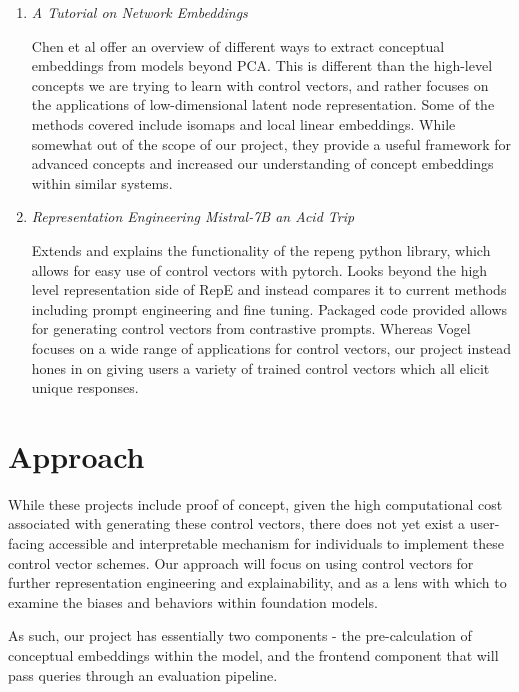 \documentclass[11pt,a4paper]{article}
\begin{document}
\begin{enumerate}
\item \emph{A Tutorial on Network Embeddings}~\cite{chen2018network}

Chen et al offer an overview of different ways to extract conceptual embeddings from models beyond PCA. This is different than the high-level concepts we are trying to learn with control vectors, and rather focuses on the applications of low-dimensional latent node representation. Some of the methods covered include isomaps and local linear embeddings. While somewhat out of the scope of our project, they provide a useful framework for advanced concepts and increased our understanding of concept embeddings within similar systems.

\item \emph{Representation Engineering Mistral-7B an Acid Trip}~\cite{vogel2024repeng}

Extends and explains the functionality of the repeng python library, which allows for easy use of control vectors with pytorch. Looks beyond the high level representation side of RepE and instead compares it to current methods including prompt engineering and fine tuning. Packaged code provided allows for generating control vectors from contrastive prompts. Whereas Vogel focuses on a wide range of applications for control vectors, our project instead hones in on giving users a variety of trained control vectors which all elicit unique responses. 

\end{enumerate}


\section{Approach}
While these projects include proof of concept, given the high computational cost associated with generating these control vectors, there does not yet exist a user-facing accessible and interpretable mechanism for individuals to implement these control vector schemes. Our approach will focus on using control vectors for further representation engineering and explainability, and as a lens with which to examine the biases and behaviors within foundation models. 

As such, our project has essentially two components - the pre-calculation of conceptual embeddings within the model, and the frontend component that will pass queries through an evaluation pipeline.
\end{document}
